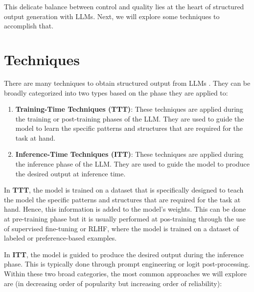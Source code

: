 This delicate balance between control and quality lies at the heart of structured output generation with LLMs. Next, we will explore some techniques to accomplish that.
\section{Techniques}

There are many techniques to obtain structured output from LLMs . They can be broadly categorized into two types based on the phase they are applied to:

\begin{enumerate}
    \item \textbf{Training-Time Techniques (TTT)}: These techniques are applied during the training or post-training phases of the LLM. They are used to guide the model to learn the specific patterns and structures that are required for the task at hand.
    \item \textbf{Inference-Time Techniques (ITT)}: These techniques are applied during the inference phase of the LLM. They are used to guide the model to produce the desired output at inference time.
\end{enumerate}

In \textbf{TTT}, the model is trained on a dataset that is specifically designed to teach the model the specific patterns and structures that are required for the task at hand. Hence, this information is added to the model's weights. This can be done at pre-training phase but it is usually performed at pos-training through the use of supervised fine-tuning or RLHF, where the model is trained on a dataset of labeled or preference-based examples.

In \textbf{ITT}, the model is guided to produce the desired output during the inference phase. This is typically done through prompt engineering or logit post-processing.
Within these two broad categories, the most common approaches we will explore are (in decreasing order of popularity but increasing order of reliability):

